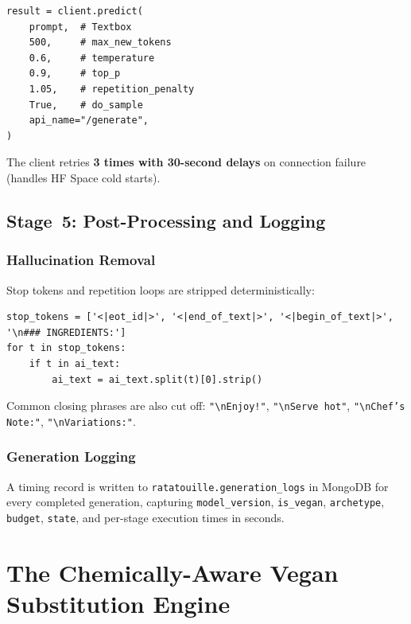 \documentclass[12pt, a4paper]{article}
\begin{document}
\begin{lstlisting}[style=python, caption={Parameters passed to the Hugging Face Gradio Space.}]
result = client.predict(
    prompt,  # Textbox
    500,     # max_new_tokens
    0.6,     # temperature
    0.9,     # top_p
    1.05,    # repetition_penalty
    True,    # do_sample
    api_name="/generate",
)
\end{lstlisting}

The client retries \textbf{3 times with 30-second delays} on connection failure (handles HF
Space cold starts).

\subsection{Stage~5: Post-Processing and Logging}

\subsubsection{Hallucination Removal}

Stop tokens and repetition loops are stripped deterministically:
\begin{lstlisting}[style=python, caption={Stop token stripping.}]
stop_tokens = ['<|eot_id|>', '<|end_of_text|>', '<|begin_of_text|>', '\n### INGREDIENTS:']
for t in stop_tokens:
    if t in ai_text:
        ai_text = ai_text.split(t)[0].strip()
\end{lstlisting}

Common closing phrases are also cut off: \texttt{"\textbackslash nEnjoy!"}, \texttt{"\textbackslash nServe hot"}, \texttt{"\textbackslash nChef's Note:"}, \texttt{"\textbackslash nVariations:"}.

\subsubsection{Generation Logging}

A timing record is written to \texttt{ratatouille.generation\_logs} in MongoDB for every
completed generation, capturing \texttt{model\_version}, \texttt{is\_vegan}, \texttt{archetype},
\texttt{budget}, \texttt{state}, and per-stage execution times in seconds.

\section{The Chemically-Aware Vegan Substitution Engine}
\label{sec:vegan}
\end{document}
